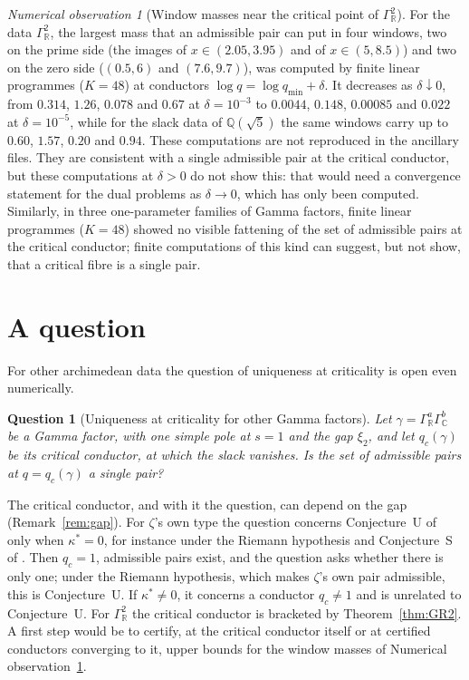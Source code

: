 \documentclass[11pt]{amsart}
\newcommand{\QQ}{\mathbb Q}
\newcommand{\xin}[1]{\xi_{#1}}
\newcommand{\GR}{\Gamma_{\mathbb R}}
\newcommand{\GC}{\Gamma_{\mathbb C}}
\newcommand{\kstar}{\kappa^{*}}
\newcommand{\qmin}{q_{\min}}
\newtheorem{question}[theorem]{Question}
\theoremstyle{definition}
\theoremstyle{remark}
\newtheorem{observation}[theorem]{Numerical observation}
\numberwithin{equation}{section}
\begin{document}
\begin{observation}[Window masses near the critical point of $\GR^2$]\label{obs:windows}
For the data $\GR^2$, the largest mass that an admissible pair can put in four windows, two on the prime side (the images of
$x\in(2.05,3.95)$ and of $x\in(5,8.5)$) and two on the zero side ($(0.5,6)$ and $(7.6,9.7)$), was computed by finite linear
programmes ($K=48$) at conductors $\log q=\log\qmin+\delta$. It decreases as $\delta\downarrow0$, from $0.314$, $1.26$,
$0.078$ and $0.67$ at $\delta=10^{-3}$ to $0.0044$, $0.148$, $0.00085$ and $0.022$ at $\delta=10^{-5}$, while for the slack data of
$\QQ(\sqrt5)$ the same windows carry up to $0.60$, $1.57$, $0.20$ and $0.94$. These computations are not reproduced in the
ancillary files. They are consistent with a single admissible pair at the critical conductor, but these computations at $\delta>0$
do not show this: that would need a convergence statement for the dual problems as $\delta\to0$, which has only been computed.
Similarly, in three one-parameter families of Gamma factors, finite linear programmes ($K=48$) showed no visible fattening of the
set of admissible pairs at the critical conductor; finite computations of this kind can suggest, but not show, that a critical
fibre is a single pair.
\end{observation}

\section{A question}\label{sec:question}

For other archimedean data the question of uniqueness at criticality is open even numerically.

\begin{question}[Uniqueness at criticality for other Gamma factors]\label{conj:Ggen}
Let $\gamma=\GR^a\GC^b$ be a Gamma factor, with one simple pole at $s=1$ and the gap $\xin2$, and let $q_c(\gamma)$ be its critical
conductor, at which the slack vanishes. Is the set of admissible pairs at $q=q_c(\gamma)$ a single pair?
\end{question}

The critical conductor, and with it the question, can depend on the gap (Remark~\ref{rem:gap}). For $\zeta$'s own type the
question concerns Conjecture~U of \cite{PaperI} only when $\kstar=0$, for instance under the Riemann hypothesis and Conjecture~S of
\cite{PaperI}. Then $q_c=1$, admissible pairs exist, and the question asks whether there is only one; under the Riemann hypothesis,
which makes $\zeta$'s own pair admissible, this is Conjecture~U. If $\kstar\ne0$, it concerns a conductor $q_c\ne1$ and is unrelated
to Conjecture~U. For $\GR^2$ the critical conductor is bracketed by Theorem~\ref{thm:GR2}. A first step would be to certify, at the critical
conductor itself or at certified conductors converging to it, upper bounds for the window masses of Numerical
observation~\ref{obs:windows}.
\end{document}
